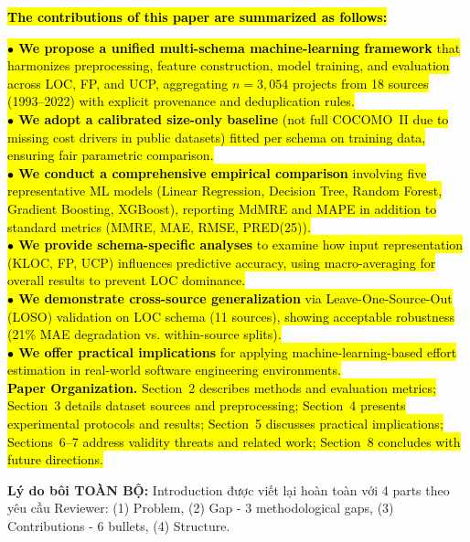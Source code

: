\documentclass[11pt,a4paper]{article}
\begin{document}
{\begin{minipage}{\dimexpr\textwidth-2\fboxsep-2\fboxrule}
\hl{\textbf{The contributions of this paper are summarized as follows:}}

\hl{\textbf{$\bullet$ We propose a unified multi-schema machine-learning framework} that harmonizes preprocessing, feature construction, model training, and evaluation across LOC, FP, and UCP, aggregating $n=3{,}054$ projects from 18 sources (1993--2022) with explicit provenance and deduplication rules.}\\[0.3em]

\hl{\textbf{$\bullet$ We adopt a calibrated size-only baseline} (not full COCOMO~II due to missing cost drivers in public datasets) fitted per schema on training data, ensuring fair parametric comparison.}\\[0.3em]

\hl{\textbf{$\bullet$ We conduct a comprehensive empirical comparison} involving five representative ML models (Linear Regression, Decision Tree, Random Forest, Gradient Boosting, XGBoost), reporting MdMRE and MAPE in addition to standard metrics (MMRE, MAE, RMSE, PRED(25)).}\\[0.3em]

\hl{\textbf{$\bullet$ We provide schema-specific analyses} to examine how input representation (KLOC, FP, UCP) influences predictive accuracy, using macro-averaging for overall results to prevent LOC dominance.}\\[0.3em]

\hl{\textbf{$\bullet$ We demonstrate cross-source generalization} via Leave-One-Source-Out (LOSO) validation on LOC schema (11 sources), showing acceptable robustness (21\% MAE degradation vs. within-source splits).}\\[0.3em]

\hl{\textbf{$\bullet$ We offer practical implications} for applying machine-learning-based effort estimation in real-world software engineering environments.}\\[0.5em]

\hl{\textbf{Paper Organization.} Section~2 describes methods and evaluation metrics; Section~3 details dataset sources and preprocessing; Section~4 presents experimental protocols and results; Section~5 discusses practical implications; Sections~6--7 address validity threats and related work; Section~8 concludes with future directions.}
\end{minipage}}

\textbf{Lý do bôi TOÀN BỘ:} Introduction được viết lại hoàn toàn với 4 parts theo yêu cầu Reviewer: (1) Problem, (2) Gap - 3 methodological gaps, (3) Contributions - 6 bullets, (4) Structure.
\end{document}
